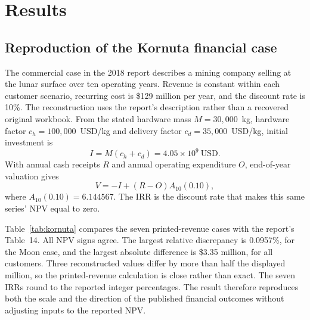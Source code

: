 \documentclass[final,5p,times,twocolumn]{elsarticle}
\begin{document}
\section{Results}
\subsection{Reproduction of the Kornuta financial case}
The commercial case in the 2018 report describes a mining company selling at the lunar surface over ten operating years. Revenue is constant within each customer scenario, recurring cost is \$129 million per year, and the discount rate is 10\%. The reconstruction uses the report's description rather than a recovered original workbook. From the stated hardware mass $M=30{,}000$~kg, hardware factor $c_h=100{,}000$~USD/kg and delivery factor $c_d=35{,}000$~USD/kg, initial investment is
\begin{equation}
I=M(c_h+c_d)=4.05\times10^9\ \mathrm{USD}.
\end{equation}
With annual cash receipts $R$ and annual operating expenditure $O$, end-of-year valuation gives
\begin{equation}
V=-I+(R-O)A_{10}(0.10),
\label{eq:kornuta}
\end{equation}
where $A_{10}(0.10)=6.144567$. The IRR is the discount rate that makes this same series' NPV equal to zero.

Table~\ref{tab:kornuta} compares the seven printed-revenue cases with the report's Table~14. All NPV signs agree. The largest relative discrepancy is 0.0957\%, for the Moon case, and the largest absolute difference is \$3.35 million, for all customers. Three reconstructed values differ by more than half the displayed million, so the printed-revenue calculation is close rather than exact. The seven IRRs round to the reported integer percentages. The result therefore reproduces both the scale and the direction of the published financial outcomes without adjusting inputs to the reported NPV.
\end{document}
